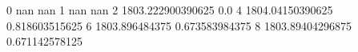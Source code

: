 0 nan nan
1 nan nan
2 1803.222900390625 0.0
4 1804.04150390625 0.818603515625
6 1803.896484375 0.673583984375
8 1803.89404296875 0.671142578125
